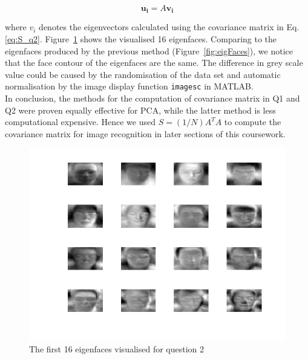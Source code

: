 \documentclass[10pt,twocolumn,letterpaper]{article}
\begin{document}
\begin{equation}
	\boldsymbol{u_i} = A \boldsymbol{v_i}
\end{equation}

where $v_i$ denotes the eigenvectors calculated using the covariance matrix in Eq.\ref{eq:S_q2}. Figure~\ref{fig:q2_eigFaces} shows the visualised 16 eigenfaces. Comparing to the eigenfaces produced by the previous method (Figure~\ref{fig:eigFaces}), we notice that the face contour of the eigenfaces are the same. The difference in grey scale value could be caused by the randomisation of the data set and automatic normalisation by the image display function \texttt{imagesc} in MATLAB.\\

In conclusion, the methods for the computation of covariance matrix in Q1 and Q2 were proven equally effective for PCA, while the latter method is less computational expensive. Hence we used $S = (1/N) A^T A$ to compute the covariance matrix for image recognition in later sections of this coursework.


\begin{figure}
	\begin{center}
		\includegraphics[width=1\linewidth]{q2_eigenfaces}
		\caption{The first 16 eigenfaces visualised for question 2}
		\label{fig:q2_eigFaces}
	\end{center}
\end{figure}

\end{document}
